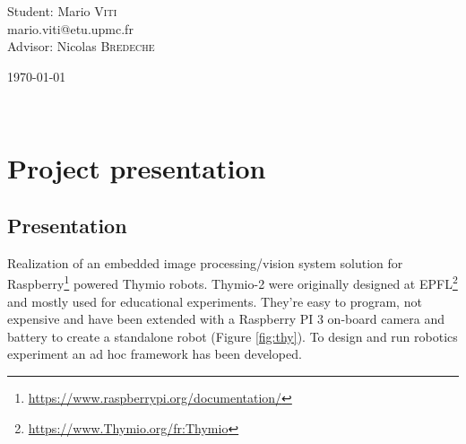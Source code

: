 \documentclass[a4paper]{report}
\begin{document}
\begin{titlepage}
\begin{center}
\HRule \\[1.5cm]

\begin{minipage}{0.4\textwidth}
\begin{flushleft} \large
\emph{}\\
Student: Mario \textsc{Viti}\\
mario.viti@etu.upmc.fr\\
Advisor: Nicolas \textsc{Bredeche}\\


\end{flushleft}
\end{minipage}

\vfill

{\large \today}

\end{center}
\end{titlepage}

~

%



\renewcommand{\arraystretch}{1.5}




\section{Project presentation}

\subsection{Presentation}
Realization of an embedded image processing/vision system solution for Raspberry\footnote{\url{https://www.raspberrypi.org/documentation/}} powered Thymio robots.
Thymio-2 were originally designed at EPFL\footnote{\url{https://www.Thymio.org/fr:Thymio}} and mostly used for educational experiments. They're easy to program, not expensive and have been extended with a Raspberry PI 3 on-board camera and battery to create a standalone robot (Figure \ref{fig:thy}). To design and run robotics experiment an ad hoc framework has been developed.
\end{document}
